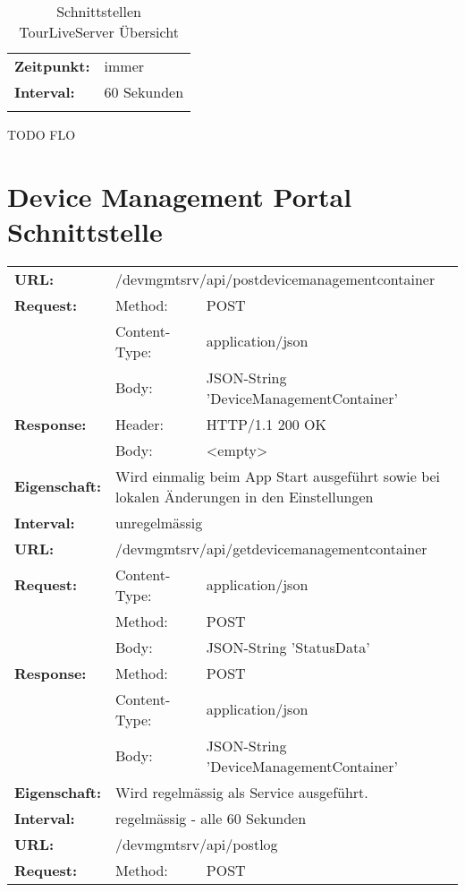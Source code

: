 {\begin{longtable}{ p{2.5cm} p{3.5cm} p{7cm}}
	\textbf{Zeitpunkt:} & \multicolumn{2}{p{10cm}}{immer} \\ 
	\textbf{Interval:} & \multicolumn{2}{p{10cm}}{60 Sekunden} \\
\hline
\hline 
\caption{Schnittstellen TourLiveServer Übersicht}
\end{longtable} }
TODO FLO

\section{Device Management Portal Schnittstelle}


{\renewcommand{\arraystretch}{1.1}%
    \begin{longtable}{ p{2.5cm} p{3.5cm} p{7cm}}
	\textbf{URL:} & \multicolumn{2}{l}{/devmgmtsrv/api/postdevicemanagementcontainer} \\
	\textbf{Request:} & Method: & POST \\
		& Content-Type: & application/json \\
		& Body: & JSON-String 'DeviceManagementContainer'\\
	\textbf{Response:} &  Header: & HTTP/1.1 200 OK \\
		& Body: & <empty>	\\
	\textbf{Eigenschaft:} & \multicolumn{2}{p{10cm}}{Wird einmalig beim App Start ausgeführt sowie bei lokalen Änderungen in den Einstellungen} \\
	\textbf{Interval:} & \multicolumn{2}{p{10cm}}{unregelmässig} \\
\hline
\hline    
	\textbf{URL:} & \multicolumn{2}{l}{/devmgmtsrv/api/getdevicemanagementcontainer} \\
	\textbf{Request:} & Content-Type: & application/json \\
		& Method: & POST \\
		& Body: & JSON-String 'StatusData' \\
	\textbf{Response:} & Method: & POST \\
		& Content-Type: & application/json \\
		& Body: & JSON-String 'DeviceManagementContainer' \\
	\textbf{Eigenschaft:} & \multicolumn{2}{p{10cm}}{Wird regelmässig als Service ausgeführt.} \\ 
	\textbf{Interval:} & \multicolumn{2}{p{10cm}}{regelmässig - alle 60 Sekunden} \\
\hline
\hline    
	\textbf{URL:} & \multicolumn{2}{p{10cm}}{/devmgmtsrv/api/postlog} \\
	\textbf{Request:} & Method: & POST \\

\end{longtable}}
